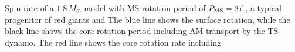  \label{fig:MRI1.8rot} Spin rate of a $1.8 \, M_\odot$ model with MS rotation period of $P_{\rm MS} = 2 \, {\rm d}$, a typical progenitor of red giants and  The blue line shows the surface rotation, while the black line shows the core rotation period including AM transport by the TS dynamo. The red line shows the core rotation rate including